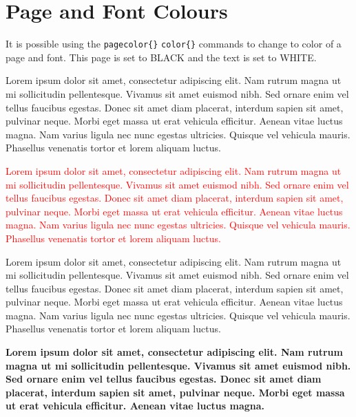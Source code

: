 \newpage

\pagecolor{black}
\color{white}

\section{Page and Font Colours}


It is possible using the \verb|pagecolor{}| \verb|color{}| commands to change to color of a page and font. This page is set to BLACK and the text is set to WHITE.

\vspace{0.4cm}

Lorem ipsum dolor sit amet, consectetur adipiscing elit. Nam rutrum magna ut mi sollicitudin pellentesque. Vivamus sit amet euismod nibh. Sed ornare enim vel tellus faucibus egestas. Donec sit amet diam placerat, interdum sapien sit amet, pulvinar neque. Morbi eget massa ut erat vehicula efficitur. Aenean vitae luctus magna. Nam varius ligula nec nunc egestas ultricies. Quisque vel vehicula mauris. Phasellus venenatis tortor et lorem aliquam luctus.


\textcolor{red}{Lorem ipsum dolor sit amet, consectetur adipiscing elit. Nam rutrum magna ut mi sollicitudin pellentesque. Vivamus sit amet euismod nibh. Sed ornare enim vel tellus faucibus egestas. Donec sit amet diam placerat, interdum sapien sit amet, pulvinar neque. Morbi eget massa ut erat vehicula efficitur. Aenean vitae luctus magna. Nam varius ligula nec nunc egestas ultricies. Quisque vel vehicula mauris. Phasellus venenatis tortor et lorem aliquam luctus.}


Lorem ipsum dolor sit amet, consectetur adipiscing elit. Nam rutrum magna ut mi sollicitudin pellentesque. Vivamus sit amet euismod nibh. Sed ornare enim vel tellus faucibus egestas. Donec sit amet diam placerat, interdum sapien sit amet, pulvinar neque. Morbi eget massa ut erat vehicula efficitur. Aenean vitae luctus magna. Nam varius ligula nec nunc egestas ultricies. Quisque vel vehicula mauris. Phasellus venenatis tortor et lorem aliquam luctus.

\textbf{Lorem ipsum dolor sit amet, consectetur adipiscing elit. Nam rutrum magna ut mi sollicitudin pellentesque. Vivamus sit amet euismod nibh. Sed ornare enim vel tellus faucibus egestas. Donec sit amet diam placerat, interdum sapien sit amet, pulvinar neque. Morbi eget massa ut erat vehicula efficitur. Aenean vitae luctus magna.}


\newpage

\pagecolor{white}


